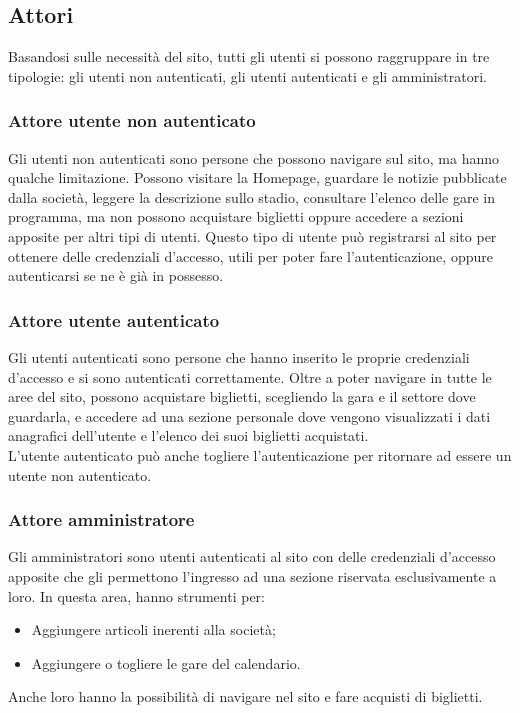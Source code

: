     \subsection{Attori}
    Basandosi sulle necessità del sito, tutti gli utenti si possono raggruppare in tre tipologie: gli utenti non autenticati, gli utenti autenticati e gli amministratori.
    
        \subsubsection{Attore utente non autenticato}
        
        Gli utenti non autenticati sono persone che possono navigare sul sito, ma hanno qualche limitazione. Possono visitare la Homepage, guardare le notizie pubblicate dalla società, leggere la descrizione sullo stadio, consultare l'elenco delle gare in programma, ma non possono acquistare biglietti oppure accedere a sezioni apposite per altri tipi di utenti. Questo tipo di utente può registrarsi al sito per ottenere delle credenziali d'accesso, utili per poter fare l'autenticazione, oppure autenticarsi se ne è già in possesso.
        
        \subsubsection{Attore utente autenticato}
        
        Gli utenti autenticati sono persone che hanno inserito le proprie credenziali d'accesso e si sono autenticati correttamente. Oltre a poter navigare in tutte le aree del sito, possono acquistare biglietti, scegliendo la gara e il settore dove guardarla, e accedere ad una sezione personale dove vengono visualizzati i dati anagrafici dell'utente e l'elenco dei suoi biglietti acquistati.\\ L'utente autenticato può anche togliere l'autenticazione per ritornare ad essere un utente non autenticato.
        
        \subsubsection{Attore amministratore}
        
        Gli amministratori sono utenti autenticati al sito con delle credenziali d'accesso apposite che gli permettono l'ingresso ad una sezione riservata esclusivamente a loro. In questa area, hanno strumenti per:
        \begin{itemize}
            \item Aggiungere articoli inerenti alla società;
            \item Aggiungere o togliere le gare del calendario.
        \end{itemize}
        Anche loro hanno la possibilità di navigare nel sito e fare acquisti di biglietti.
        

